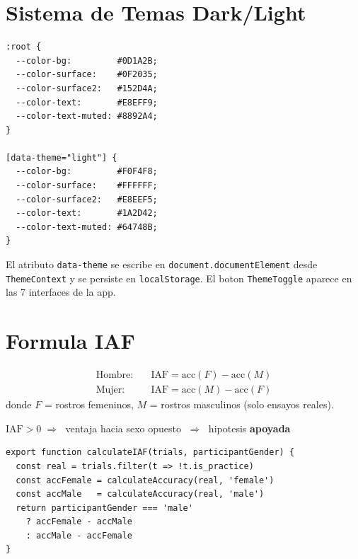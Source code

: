 \documentclass[12pt,a4paper]{article}
\begin{document}
\section{Sistema de Temas Dark/Light}

\begin{tcolorbox}[codebox, title={src/index.css --- Variables CSS}]
\begin{verbatim}
:root {
  --color-bg:         #0D1A2B;
  --color-surface:    #0F2035;
  --color-surface2:   #152D4A;
  --color-text:       #E8EFF9;
  --color-text-muted: #8892A4;
}

[data-theme="light"] {
  --color-bg:         #F0F4F8;
  --color-surface:    #FFFFFF;
  --color-surface2:   #E8EEF5;
  --color-text:       #1A2D42;
  --color-text-muted: #64748B;
}
\end{verbatim}
\end{tcolorbox}

El atributo \texttt{data-theme} se escribe en \texttt{document.documentElement}
desde \texttt{ThemeContext} y se persiste en \texttt{localStorage}.
El boton \texttt{ThemeToggle} aparece en las 7 interfaces de la app.

\section{Formula IAF}

\begin{tcolorbox}[infobox, title={Indice de Afinidad Facial (IAF)}]
\begin{align}
  \text{Hombre:}\quad & \text{IAF} =
    \text{acc}(F) - \text{acc}(M) \\[4pt]
  \text{Mujer:}\quad & \text{IAF} =
    \text{acc}(M) - \text{acc}(F)
\end{align}
donde $F$ = rostros femeninos, $M$ = rostros masculinos (solo ensayos reales).

\medskip
$\text{IAF} > 0 \;\Rightarrow\;$ ventaja hacia sexo opuesto $\;\Rightarrow\;$
hipotesis \textbf{apoyada}
\end{tcolorbox}

\begin{lstlisting}[caption={calculateIAF en statistics.js}]
export function calculateIAF(trials, participantGender) {
  const real = trials.filter(t => !t.is_practice)
  const accFemale = calculateAccuracy(real, 'female')
  const accMale   = calculateAccuracy(real, 'male')
  return participantGender === 'male'
    ? accFemale - accMale
    : accMale - accFemale
}
\end{lstlisting}
\end{document}
